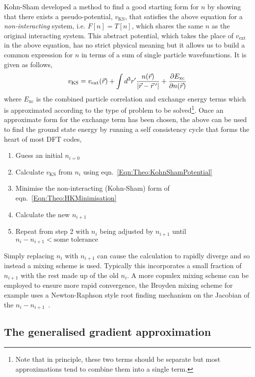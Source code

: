 Kohn-Sham developed a method to find a good starting form for $n$ by showing that there exists a pseudo-potential, $v_{\textrm{KS}}$, that satisfies the above equation for a \emph{non-interacting} system, i.e. $F[n] = T[n]$, which shares the same $n$ as the original interacting system. This abstract potential, which takes the place of $v_{\textrm{ext}}$ in the above equation, has no strict physical meaning but it allows us to build a common expression for $n$ in terms of a sum of single particle wavefunctions. It is given as follows,
\begin{equation}
\label{Eqn:Theo:KohnShamPotential}
v_{\textrm{KS}} = v_{\textrm{ext}}(\vec{r}) + \int d^3r^\prime\frac{n(\vec{r})}{|\vec{r}-\vec{r}^{\hspace{2px}\prime}|} + \frac{\partial E_{\textrm{xc}}}{\partial n(\vec{r})}
\end{equation}
where $E_{\textrm{xc}}$ is the combined particle correlation and exchange energy terms which is approximated according to the type of problem to be solved\footnote{Note that in principle, these two terms should be separate but most approximations tend to combine them into a single term.}.  Once an approximate form for the exchange term has been chosen, the above can be used to find the ground state energy by running a self consistency cycle that forms the heart of most \ac{DFT} codes,
\begin{enumerate}
    \item Guess an initial $n_{i=0}$
    \item Calculate $v_{\textrm{KS}}$ from $n_{i}$ using eqn.~\ref{Eqn:Theo:KohnShamPotential}
    \item Minimise the non-interacting (Kohn-Sham) form of eqn.~\ref{Eqn:Theo:HKMinimisation}
    \item Calculate the new $n_{i+1}$
    \item Repeat from step 2 with $n_i$ being adjusted by $n_{i+1}$ until $n_{i} - n_{i+1} < \textrm{some tolerance}$
\end{enumerate}
Simply replacing $n_{i}$ with $n_{i+1}$ can cause the calculation to rapidly diverge and so instead a mixing scheme is used. Typically this incorporates a small fraction of $n_{i+1}$ with the rest made up of the old $n_{i}$. A more copmlex mixing scheme can be employed to ensure more rapid convergence, the Broyden mixing scheme for example uses a Newton-Raphson style root finding mechanism on the Jacobian of the $n_{i} - n_{i+1}$~\cite{Broyden1965}.


\subsection{The generalised gradient approximation}

